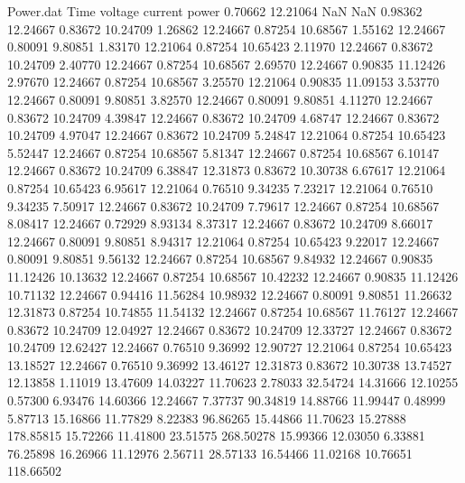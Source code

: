 \begin{filecontents}{Power.dat}
Time voltage current power
   0.70662   12.21064        NaN        NaN
   0.98362   12.24667    0.83672   10.24709
   1.26862   12.24667    0.87254   10.68567
   1.55162   12.24667    0.80091    9.80851
   1.83170   12.21064    0.87254   10.65423
   2.11970   12.24667    0.83672   10.24709
   2.40770   12.24667    0.87254   10.68567
   2.69570   12.24667    0.90835   11.12426
   2.97670   12.24667    0.87254   10.68567
   3.25570   12.21064    0.90835   11.09153
   3.53770   12.24667    0.80091    9.80851
   3.82570   12.24667    0.80091    9.80851
   4.11270   12.24667    0.83672   10.24709
   4.39847   12.24667    0.83672   10.24709
   4.68747   12.24667    0.83672   10.24709
   4.97047   12.24667    0.83672   10.24709
   5.24847   12.21064    0.87254   10.65423
   5.52447   12.24667    0.87254   10.68567
   5.81347   12.24667    0.87254   10.68567
   6.10147   12.24667    0.83672   10.24709
   6.38847   12.31873    0.83672   10.30738
   6.67617   12.21064    0.87254   10.65423
   6.95617   12.21064    0.76510    9.34235
   7.23217   12.21064    0.76510    9.34235
   7.50917   12.24667    0.83672   10.24709
   7.79617   12.24667    0.87254   10.68567
   8.08417   12.24667    0.72929    8.93134
   8.37317   12.24667    0.83672   10.24709
   8.66017   12.24667    0.80091    9.80851
   8.94317   12.21064    0.87254   10.65423
   9.22017   12.24667    0.80091    9.80851
   9.56132   12.24667    0.87254   10.68567
   9.84932   12.24667    0.90835   11.12426
  10.13632   12.24667    0.87254   10.68567
  10.42232   12.24667    0.90835   11.12426
  10.71132   12.24667    0.94416   11.56284
  10.98932   12.24667    0.80091    9.80851
  11.26632   12.31873    0.87254   10.74855
  11.54132   12.24667    0.87254   10.68567
  11.76127   12.24667    0.83672   10.24709
  12.04927   12.24667    0.83672   10.24709
  12.33727   12.24667    0.83672   10.24709
  12.62427   12.24667    0.76510    9.36992
  12.90727   12.21064    0.87254   10.65423
  13.18527   12.24667    0.76510    9.36992
  13.46127   12.31873    0.83672   10.30738
  13.74527   12.13858    1.11019   13.47609
  14.03227   11.70623    2.78033   32.54724
  14.31666   12.10255    0.57300    6.93476
  14.60366   12.24667    7.37737   90.34819
  14.88766   11.99447    0.48999    5.87713
  15.16866   11.77829    8.22383   96.86265
  15.44866   11.70623   15.27888  178.85815
  15.72266   11.41800   23.51575  268.50278
  15.99366   12.03050    6.33881   76.25898
  16.26966   11.12976    2.56711   28.57133
  16.54466   11.02168   10.76651  118.66502

\end{filecontents}
